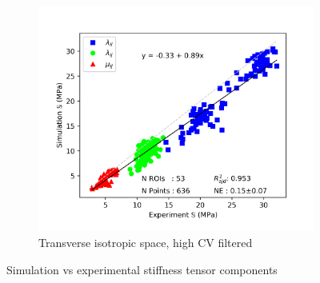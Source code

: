 \documentclass[a4paper,fleqn]{DC_ArtStyle}
\begin{document}
\begin{figure}[!h]
\begin{subfigure}[t]{.3\linewidth}
		\includegraphics[height=0.8\linewidth]{../Results/ExpSim_S_Filt}
		\caption{Transverse isotropic space, high CV filtered}
		\end{subfigure}		
		\caption{Simulation vs experimental stiffness tensor components}
	\end{figure}
\end{document}
